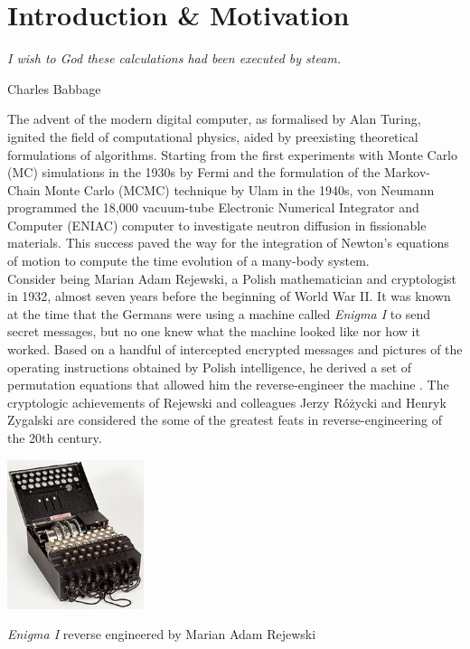 \chapter{Introduction \& Motivation}
\label{chapter:introduction}
%
\epigraph{\textit{I wish to God these calculations had been executed by steam.}}{Charles Babbage}
The advent of the modern digital computer, as formalised by Alan Turing,\cite{Turing1937} ignited the field of computational physics, aided by preexisting theoretical formulations of algorithms. Starting from the first experiments with Monte Carlo (MC) simulations in the 1930s by Fermi and the formulation of the Markov-Chain Monte Carlo (MCMC) technique by Ulam in the 1940s, von Neumann programmed the 18,000 vacuum-tube Electronic Numerical Integrator and Computer (ENIAC) computer to investigate neutron diffusion in fissionable materials.\cite{metropolis1987beginning} This success paved the way for the integration of Newton's equations of motion to compute the time evolution of a many-body system.\\

Consider being Marian Adam Rejewski, a Polish mathematician and cryptologist in 1932, almost
seven years before the beginning of World War II. It was known at the time that the Germans
were using a machine called \textit{Enigma I} to send secret messages, but no one knew what
the machine looked like nor how it worked. Based on a handful of intercepted encrypted
messages and pictures of the operating instructions obtained by Polish intelligence,
he derived a set of permutation equations that allowed him the reverse-engineer the machine
\cite{Turing2018XBroken}. The cryptologic achievements of Rejewski and colleagues
Jerzy R\'o\.zycki and Henryk Zygalski are considered the some of the greatest feats in
reverse-engineering of the 20th century.

\begin{Figure}
    \includegraphics[width=40mm]{figures/enigma.jpg}
    \caption{\textit{Enigma I} reverse engineered by Marian Adam Rejewski}
    \label{fig:enigma}
\end{Figure}
\noindent

